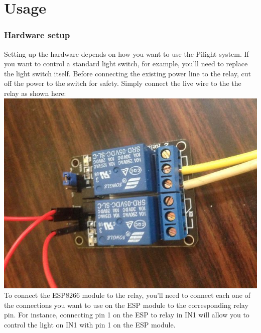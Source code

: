 \section{Usage}
\subsubsection{Hardware setup}
Setting up the hardware depends on how you want to use the Pilight system. If you want to control a standard light switch, for example, you'll need to replace the light switch itself. Before connecting the existing power line to the relay, cut off the power to the switch for safety. Simply connect the live wire to the the relay as shown here:\\
\includegraphics[scale=0.5]{relay}\\
To connect the ESP8266 module to the relay, you'll need to connect each one of the connections you want to use on the ESP module to the corresponding relay pin. For instance, connecting pin 1 on the ESP to relay in IN1 will allow you to control the light on IN1 with pin 1 on the ESP module.\\
